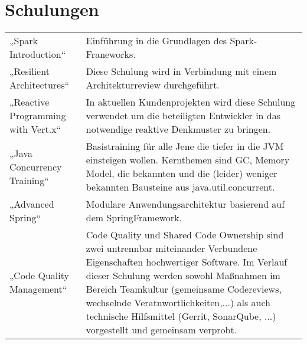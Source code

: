 \section*{Schulungen}
\begin{longtable}{@{}p{6cm}p{10cm}}
„Spark Introduction“	 & Einführung in die Grundlagen des Spark-Franeworks. \\
„Resilient Architectures“ 	& Diese Schulung wird in Verbindung mit einem Architekturreview durchgeführt.\\
„Reactive Programming with Vert.x“ 	& In aktuellen Kundenprojekten wird diese Schulung verwendet um die beteiligten Entwickler in das notwendige reaktive Denkmuster zu bringen.\\
„Java Concurrency Training“ 	& Basistraining für alle Jene die tiefer in die JVM einsteigen wollen. Kernthemen sind GC, Memory Model, die bekannten und die (leider) weniger bekannten Bausteine aus java.util.concurrent. \\
„Advanced Spring“ 	& Modulare Anwendungsarchitektur basierend auf dem SpringFramework.\\
„Code Quality Management“ 	& Code Quality und Shared Code Ownership sind zwei untrennbar miteinander Verbundene Eigenschaften hochwertiger Software. Im Verlauf dieser Schulung werden sowohl Maßnahmen im Bereich Teamkultur (gemeinsame Codereviews, wechselnde Veratnwortlichkeiten,...) als auch technische Hilfsmittel (Gerrit, SonarQube, ...) vorgestellt und gemeinsam verprobt.\\
\end{longtable}
